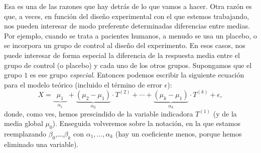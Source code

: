 Esa es una de las razones que hay detrás de lo que vamos a hacer. Otra razón es que, a veces, en
función del diseño experimental con el que estemos trabajando, nos pueden interesar de modo
preferente determinadas diferencias entre medias. Por ejemplo, cuando se trata a pacientes humanos,
a menudo se usa un placebo, o se incorpora un grupo de control al diseño del experimento. En esos
casos, nos puede interesar de forma especial la diferencia de la respuesta media entre el grupo de
control (o placebo) y cada uno de los otros grupos.  Supongamos que el grupo $1$ es ese grupo
{\em especial}. Entonces podemos escribir la siguiente ecuación para el modelo teórico (incluido el término de error $\epsilon$):
\begin{equation}
\label{cap11:ecu:AnovaContrastes}
X=\underbrace{\phantom{1}\mu_1\phantom{1}}_{\alpha_1}+
\underbrace{(\mu_2-\mu_1)}_{\alpha_2}\cdot {T^{(2)}}+\cdots+\underbrace{(\mu_k-\mu_1)}_{\alpha_k}\cdot {T^{(k)}}+\epsilon,
\end{equation}
donde, como ves, hemos prescindido de la variable indicadora $T^{(1)}$ (y de la media global
$\mu_0$). Enseguida volveremos sobre la  notación, en la que estamos reemplazando $\beta_0$,\ldots,$\beta_k$  con $\alpha_1,\ldots,\alpha_k$ (hay un coeficiente menos, porque hemos eliminado una variable).

